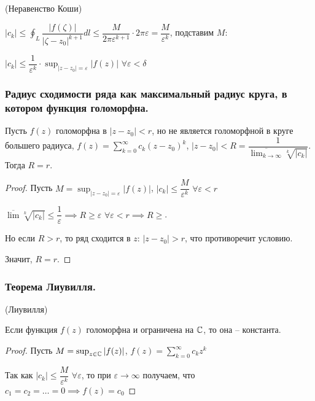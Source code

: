 \begin{corollary}
    (Неравенство Коши)

    $|c_k| \leq \oint_{L} \dfrac{|f(\zeta)|}{|\zeta - z_0|^{k + 1}} dl \leq \dfrac{M}{2\pi\varepsilon^{k+1}} \cdot 2\pi\varepsilon = \dfrac{M}{\varepsilon^{k}}$, подставим $M$:

    $|c_k| \leq \dfrac{1}{\varepsilon^{k}} \cdot \sup_{|z - z_0| = \varepsilon} |f(z)|$  $\forall \varepsilon < \delta$
\end{corollary}

\subsubsection{Радиус сходимости ряда как максимальный радиус круга, в котором функция голоморфна.}

\begin{theorem*}
    Пусть $f(z)$ голоморфна в $|z - z_0| < r$, но не является голоморфной в круге большего радиуса, $f(z) = \sum_{k=0}^{\infty} c_k(z - z_0)^k$, $|z - z_0| < R = \dfrac{1}{\overline{\lim_{k \to \infty}} \sqrt[k]{|c_k|}}$. Тогда $R = r$.
\end{theorem*}

\begin{proof}
    Пусть $M = \sup_{|z - z_0| = \varepsilon} |f(z)|$, $|c_k| \leq \dfrac{M}{\varepsilon^{k}}$  $\forall \varepsilon < r$

    $\overline{\lim}\sqrt[k]{|c_k|} \leq \dfrac{1}{\varepsilon} \implies R \geq \varepsilon$  $\forall \varepsilon < r \implies R \geq$.

    Но если $R > r$, то ряд сходится в $z$: $|z - z_0| > r$, что противоречит условию.

    Значит, $R = r$.
\end{proof}

\subsubsection{Теорема Лиувилля.}

\begin{theorem*}
    (Лиувилля)

    Если функция $f(z)$ голоморфна и ограничена на $\mathbb{C}$, то она -- константа.
\end{theorem*}

\begin{proof}
    Пусть $M = \sup_{z \in \mathbb{C}} |f(z)|$, $f(z) = \sum_{k=0}^{\infty} c_k z^{k}$

    Так как $|c_k| \leq \dfrac{M}{\varepsilon^{k}}$  $\forall \varepsilon$, то при $\varepsilon \to \infty$ получаем, что $c_1 = c_2 = \dots = 0 \implies f(z) = c_0$ 
\end{proof}
